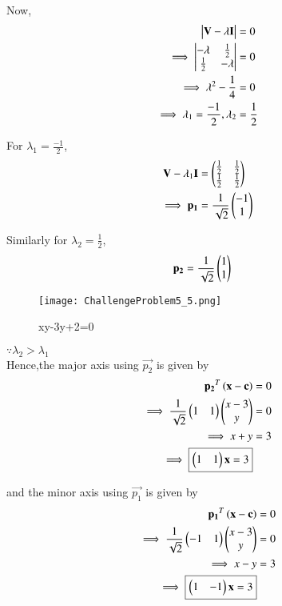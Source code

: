 \documentclass[journal,12pt,twocolumn]{IEEEtran}
\begin{document}
\begin{enumerate}
    Now,
    \begin{align}
        \begin{vmatrix}\mathbf{V}-\lambda\mathbf{I}\end{vmatrix} &= 0 \\
        \implies \begin{vmatrix}-\lambda & \frac{1}{2} \\ \frac{1}{2} & -\lambda\end{vmatrix} &= 0 \\
        \implies \lambda^2-\frac{1}{4} &= 0 \\
        \implies \lambda_1 =\frac{-1}{2},\lambda_2 &= \frac{1}{2}
    \end{align}
    
    For $\lambda_1=\frac{-1}{2}$,
    \begin{align}
        \mathbf{V}-\lambda_1\mathbf{I} &= \begin{pmatrix}\frac{1}{2} & \frac{1}{2} \\ \frac{1}{2} & \frac{1}{2}\end{pmatrix} \\
        \implies \mathbf{p_1} &= \frac{1}{\sqrt{2}}\begin{pmatrix}-1 \\ 1\end{pmatrix}
    \end{align}
    
    Similarly for $\lambda_2=\frac{1}{2}$,
    \begin{align}
        \mathbf{p_2} &= \frac{1}{\sqrt{2}}\begin{pmatrix}1 \\ 1\end{pmatrix}
    \end{align}
    
    \begin{figure}[!ht]
    \centering
    \texttt{[image: ChallengeProblem5\_5.png]}
    \caption{xy-3y+2=0}
    \label{ex5}	
    \end{figure}
    
    $\because \lambda_2>\lambda_1$ \\
    Hence,the major axis using $\vec{p_2}$ is given by
    \begin{align}
        \mathbf{p_2}^T\left(\mathbf{x}-\mathbf{c}\right) &= 0 \\
        \implies \frac{1}{\sqrt{2}}\begin{pmatrix}1 & 1\end{pmatrix}\begin{pmatrix}x-3 \\ y\end{pmatrix} &= 0 \\
        \implies x+y &= 3 \\
        \implies \boxed{\begin{pmatrix}1 & 1\end{pmatrix}\mathbf{x} =3}
    \end{align}
    
    and the minor axis using $\vec{p_1}$ is given by
    \begin{align}
        \mathbf{p_1}^T\left(\mathbf{x}-\mathbf{c}\right) &= 0 \\
        \implies \frac{1}{\sqrt{2}}\begin{pmatrix}-1 & 1\end{pmatrix}\begin{pmatrix}x-3 \\ y\end{pmatrix} &= 0 \\
        \implies x-y &= 3 \\
        \implies \boxed{\begin{pmatrix}1 & -1\end{pmatrix}\mathbf{x} =3}
    \end{align}
    
\end{enumerate}
\end{document}

